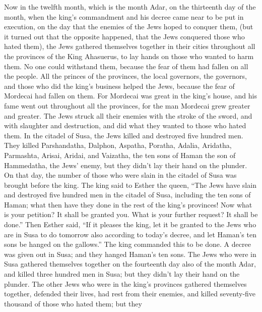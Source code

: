  Now in the twelfth month, which is the month Adar, on the
thirteenth day of the month, when the king's commandment and his decree
came near to be put in execution, on the day that the enemies of the
Jews hoped to conquer them, (but it turned out that the opposite
happened, that the Jews conquered those who hated them), 
the Jews gathered themselves together in their cities throughout all the
provinces of the King Ahasuerus, to lay hands on those who wanted to
harm them. No one could withstand them, because the fear of them had
fallen on all the people.  All the princes of the
provinces, the local governors, the governors, and those who did the
king's business helped the Jews, because the fear of Mordecai had fallen
on them.  For Mordecai was great in the king's house, and
his fame went out throughout all the provinces, for the man Mordecai
grew greater and greater.  The Jews struck all their
enemies with the stroke of the sword, and with slaughter and
destruction, and did what they wanted to those who hated them.
 In the citadel of Susa, the Jews killed and destroyed
five hundred men.  They killed Parshandatha, Dalphon,
Aspatha,  Poratha, Adalia, Aridatha, 
Parmashta, Arisai, Aridai, and Vaizatha,  the ten sons of
Haman the son of Hammedatha, the Jews' enemy, but they didn't lay their
hand on the plunder.  On that day, the number of those
who were slain in the citadel of Susa was brought before the king.
 The king said to Esther the queen, ``The Jews have slain
and destroyed five hundred men in the citadel of Susa, including the ten
sons of Haman; what then have they done in the rest of the king's
provinces! Now what is your petition? It shall be granted you. What is
your further request? It shall be done.''  Then Esther
said, ``If it pleases the king, let it be granted to the Jews who are in
Susa to do tomorrow also according to today's decree, and let Haman's
ten sons be hanged on the gallows.''  The king commanded
this to be done. A decree was given out in Susa; and they hanged Haman's
ten sons.  The Jews who were in Susa gathered themselves
together on the fourteenth day also of the month Adar, and killed three
hundred men in Susa; but they didn't lay their hand on the plunder.
 The other Jews who were in the king's provinces gathered
themselves together, defended their lives, had rest from their enemies,
and killed seventy-five thousand of those who hated them; but they
